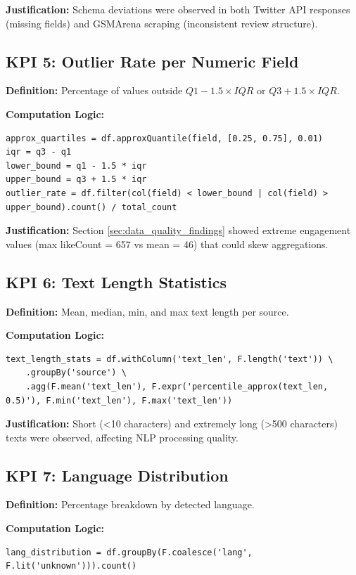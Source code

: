 \documentclass[12pt]{article}
\begin{document}
\textbf{Justification:} Schema deviations were observed in both Twitter API responses (missing fields) and GSMArena scraping (inconsistent review structure).

\subsection{KPI 5: Outlier Rate per Numeric Field}

\textbf{Definition:} Percentage of values outside \(Q1 - 1.5 \times IQR\) or \(Q3 + 1.5 \times IQR\).

\textbf{Computation Logic:}
\begin{lstlisting}
approx_quartiles = df.approxQuantile(field, [0.25, 0.75], 0.01)
iqr = q3 - q1
lower_bound = q1 - 1.5 * iqr
upper_bound = q3 + 1.5 * iqr
outlier_rate = df.filter(col(field) < lower_bound | col(field) > upper_bound).count() / total_count
\end{lstlisting}

\textbf{Justification:} Section \ref{sec:data_quality_findings} showed extreme engagement values (max likeCount = 657 vs mean = 46) that could skew aggregations.

\subsection{KPI 6: Text Length Statistics}

\textbf{Definition:} Mean, median, min, and max text length per source.

\textbf{Computation Logic:}
\begin{lstlisting}
text_length_stats = df.withColumn('text_len', F.length('text')) \
    .groupBy('source') \
    .agg(F.mean('text_len'), F.expr('percentile_approx(text_len, 0.5)'), F.min('text_len'), F.max('text_len'))
\end{lstlisting}

\textbf{Justification:} Short (<10 characters) and extremely long (>500 characters) texts were observed, affecting NLP processing quality.

\subsection{KPI 7: Language Distribution}

\textbf{Definition:} Percentage breakdown by detected language.

\textbf{Computation Logic:}
\begin{lstlisting}
lang_distribution = df.groupBy(F.coalesce('lang', F.lit('unknown'))).count()
\end{lstlisting}
\end{document}
